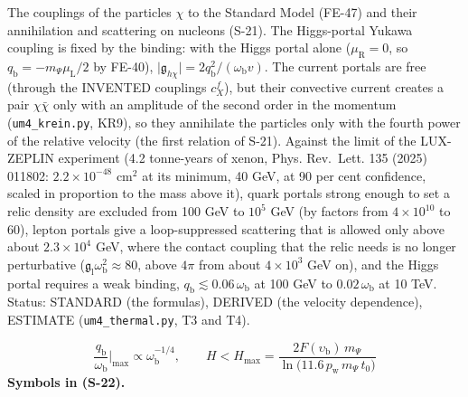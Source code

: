 \documentclass[
  10pt,
]{article}
\begin{document}
The couplings of the particles \(\chi\) to the Standard Model (FE-47)
and their annihilation and scattering on nucleons (S-21). The
Higgs-portal Yukawa coupling is fixed by the binding: with the Higgs
portal alone (\(\mu_{\mathrm{R}} = 0\), so
\(q_{\mathrm{b}} = -m_\Psi\mu_{\mathrm{L}}/2\) by FE-40),
\(\lvert\mathfrak{g}_{h\chi}\rvert = 2q_{\mathrm{b}}^2/(\omega_{\mathrm{b}}v)\).
The current portals are free (through the INVENTED couplings
\(c^{f}_X\)), but their convective current creates a pair
\(\chi\bar\chi\) only with an amplitude of the second order in the
momentum (\texttt{um4\_krein.py}, KR9), so they annihilate the particles
only with the fourth power of the relative velocity (the first relation
of S-21). Against the limit of the LUX-ZEPLIN experiment (4.2
tonne-years of xenon, Phys. Rev.~Lett. 135 (2025) 011802:
\(2.2\times10^{-48}\) cm\(^2\) at its minimum, 40 GeV, at 90 per cent
confidence, scaled in proportion to the mass above it), quark portals
strong enough to set a relic density are excluded from 100 GeV to
\(10^5\) GeV (by factors from \(4\times10^{10}\) to 60), lepton portals
give a loop-suppressed scattering that is allowed only above about
\(2.3\times10^4\) GeV, where the contact coupling that the relic needs
is no longer perturbative
(\(\mathfrak{g}_{\mathrm{l}}\omega_{\mathrm{b}}^2 \approx 80\), above
\(4\pi\) from about \(4\times10^3\) GeV on), and the Higgs portal
requires a weak binding,
\(q_{\mathrm{b}} \lesssim 0.06\,\omega_{\mathrm{b}}\) at 100 GeV to
\(0.02\,\omega_{\mathrm{b}}\) at 10 TeV. Status: STANDARD (the
formulas), DERIVED (the velocity dependence), ESTIMATE
(\texttt{um4\_thermal.py}, T3 and T4).

\[
\frac{q_{\mathrm{b}}}{\omega_{\mathrm{b}}}\Big\vert_{\max} \propto \omega_{\mathrm{b}}^{-1/4},\qquad
H < H_{\max} = \frac{2F(\upsilon_{\mathrm{b}})\,m_\Psi}{\ln\big(11.6\,p_{\mathrm{w}}\,m_\Psi\,t_0\big)} \tag{S-22}
\] \textbf{Symbols in (S-22).}
\end{document}
